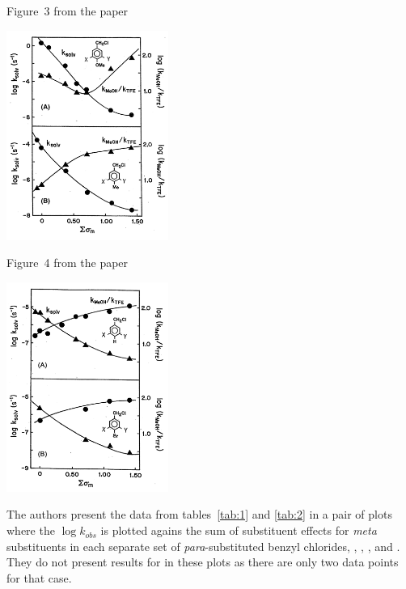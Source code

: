  \begin{marginfigure}[-20mm]
  \centering
    \caption[-0mm]{Figure~3 from the paper\tss{\ref{ref:1} } \label{fig:paperfig3}} 

  \includegraphics[width=150pt]{images/fig3paper.png}
  
  
\end{marginfigure}

 \begin{marginfigure}[0mm]
  \centering
    \caption[-0mm]{Figure~4 from the paper\tss{\ref{ref:1}} \label{fig:paperfig4}}  

  \includegraphics[width=150pt]{images/fig4paper.png}
  
  
\end{marginfigure}



The authors present the data from tables~\ref{tab:1} and \vref{tab:2} in a pair of plots where the $\log{k_{obs}}$ is plotted agains the sum of substituent effects for \textit{meta} substituents in each separate set of \textit{para}-substituted benzyl chlorides, , , , and . They do not present results for  in these plots as there are only two data points for that case.


